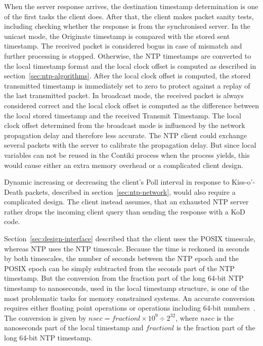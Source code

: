 When the server response arrives,
the destination timestamp determination is one of the first tasks the client does.
After that, the client makes packet sanity tests, including
checking whether the response is from the synchronised server.
In the unicast mode, the Originate timestamp is compared with the stored sent timestamp.
The received packet is considered bogus in case of mismatch and further processing is stopped.
Otherwise, the NTP timestamps are converted to the local timestamp format and
the local clock offset is computed as described in section~\ref{sec:ntp-algorithms}.
After the local clock offset is computed,
the stored transmitted timestamp is immediately set to zero
to protect against a replay of the last transmitted packet.
In broadcast mode, the received packet is always considered correct
and the local clock offset is computed as the difference between the local stored timestamp
and the received Transmit Timestamp.
The local clock offset determined from the broadcast mode
is influenced by the network propagation delay and therefore less accurate.
The NTP client could exchange several packets with the server to calibrate the propagation delay.
But since local variables can not be reused in the Contiki process when the process yields,
this would cause either an extra memory overhead or a complicated client design.

Dynamic increasing or decreasing the client's Poll interval in response to
Kiss-o'-Death packets, described in section~\ref{sec:ntp-network}, would also
require a complicated design.
The client instead assumes, that an exhausted NTP server rather drops the incoming
client query than sending the response with a KoD code.

Section~\ref{sec:design-interface} described that the client uses the POSIX timescale,
whereas NTP uses the NTP timescale.
Because the time is reckoned in seconds by both timescales,
the number of seconds between the NTP epoch and the POSIX epoch
can be simply subtracted from the seconds part of the NTP timestamp.
But the conversion from the fraction part of the long 64-bit NTP timestamp to nanoseconds,
used in the local timestamp structure,
is one of the most problematic tasks for memory constrained systems.
An accurate conversion requires either floating point operations or operations including 64-bit numbers~\cite{c99}.
The conversion is given by
$nsec = fractionl \times 10^9 \div 2^{32}$, where $nsec$ is the nanoseconds part of the local timestamp
and $fractionl$ is the fraction part of the long 64-bit NTP timestamp.

